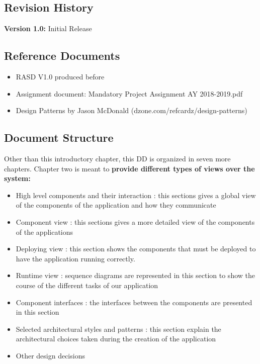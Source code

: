 \documentclass[12pt]{article}
\begin{document}
\subsection{Revision History}
\textbf{Version 1.0:} Initial Release

\subsection{Reference Documents}
\begin{itemize}
    \item RASD V1.0 produced before
    \item Assignment document: Mandatory Project Assignment AY 2018-2019.pdf
    \item Design Patterns by Jason McDonald (dzone.com/refcardz/design-patterns)
\end{itemize}

\newpage
\subsection{Document Structure}
Other than this introductory chapter, this DD is organized in seven more chapters.
Chapter two is meant to \textbf{provide different types of views over the system:}
\begin{itemize}
     \item High level components and their interaction : this sections gives a global view of the components
     of the application and how they communicate
     \item Component view : this sections gives a more detailed view of the
     components of the applications

    \item  Deploying view : this section shows the components that must be
    deployed to have the application running correctly.

    \item  Runtime view : sequence diagrams are represented in this section to
    show the course of the different tasks of our application
    \item Component interfaces : the interfaces between the components are
    presented in this section

    \item Selected architectural styles and patterns : this section explain the
    architectural choices taken during the creation of the application


    \item Other design decisions
\end{itemize}
\end{document}
